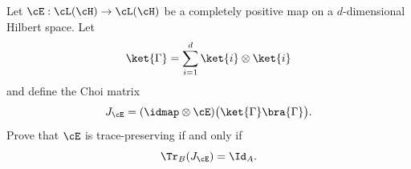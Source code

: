 Let $\cE:\cL(\cH)\to\cL(\cH)$ be a completely positive map on a $d$-dimensional Hilbert space. Let
$$
\ket{\Gamma}=\sum_{i=1}^{d}\ket{i}\otimes\ket{i}
$$
and define the Choi matrix
$$
J_{\cE}=(\idmap\otimes\cE)\bigl(\ket{\Gamma}\bra{\Gamma}\bigr).
$$
Prove that $\cE$ is trace-preserving if and only if
$$
\Tr_B(J_{\cE})=\Id_A.
$$
